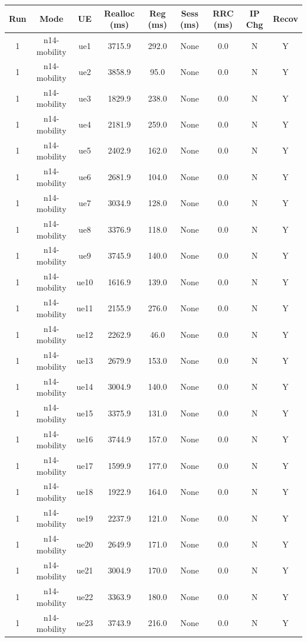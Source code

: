 \begin{table}[ht]
\centering
\begin{tabular}{|c|c|c|c|c|c|c|c|c|}
\hline
Run & Mode & UE & Realloc (ms) & Reg (ms) & Sess (ms) & RRC (ms) & IP Chg & Recov \\
\hline
1 & n14-mobility & ue1 & 3715.9 & 292.0 & None & 0.0 & N & Y \\
1 & n14-mobility & ue2 & 3858.9 & 95.0 & None & 0.0 & N & Y \\
1 & n14-mobility & ue3 & 1829.9 & 238.0 & None & 0.0 & N & Y \\
1 & n14-mobility & ue4 & 2181.9 & 259.0 & None & 0.0 & N & Y \\
1 & n14-mobility & ue5 & 2402.9 & 162.0 & None & 0.0 & N & Y \\
1 & n14-mobility & ue6 & 2681.9 & 104.0 & None & 0.0 & N & Y \\
1 & n14-mobility & ue7 & 3034.9 & 128.0 & None & 0.0 & N & Y \\
1 & n14-mobility & ue8 & 3376.9 & 118.0 & None & 0.0 & N & Y \\
1 & n14-mobility & ue9 & 3745.9 & 140.0 & None & 0.0 & N & Y \\
1 & n14-mobility & ue10 & 1616.9 & 139.0 & None & 0.0 & N & Y \\
1 & n14-mobility & ue11 & 2155.9 & 276.0 & None & 0.0 & N & Y \\
1 & n14-mobility & ue12 & 2262.9 & 46.0 & None & 0.0 & N & Y \\
1 & n14-mobility & ue13 & 2679.9 & 153.0 & None & 0.0 & N & Y \\
1 & n14-mobility & ue14 & 3004.9 & 140.0 & None & 0.0 & N & Y \\
1 & n14-mobility & ue15 & 3375.9 & 131.0 & None & 0.0 & N & Y \\
1 & n14-mobility & ue16 & 3744.9 & 157.0 & None & 0.0 & N & Y \\
1 & n14-mobility & ue17 & 1599.9 & 177.0 & None & 0.0 & N & Y \\
1 & n14-mobility & ue18 & 1922.9 & 164.0 & None & 0.0 & N & Y \\
1 & n14-mobility & ue19 & 2237.9 & 121.0 & None & 0.0 & N & Y \\
1 & n14-mobility & ue20 & 2649.9 & 171.0 & None & 0.0 & N & Y \\
1 & n14-mobility & ue21 & 3004.9 & 170.0 & None & 0.0 & N & Y \\
1 & n14-mobility & ue22 & 3363.9 & 180.0 & None & 0.0 & N & Y \\
1 & n14-mobility & ue23 & 3743.9 & 216.0 & None & 0.0 & N & Y \\

\end{tabular}
\end{table}
